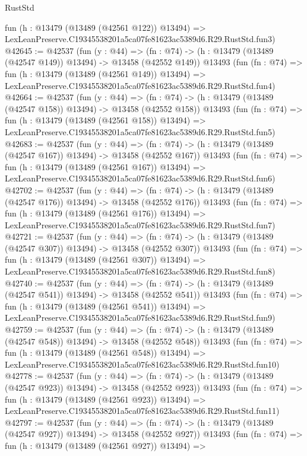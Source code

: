 \begin{lexlean}{RustStd}
\begin{coremodule}
    fun (h : @13479 (@13489 (@42561 @122)) @13494) =>
    LexLeanPreserve.C19345538201a5ca07fe81623ac5389d6.R29.RustStd.fun3)
@42645 := @42537
    (fun (y : @44) =>
    (fn : @74) -> (h : @13479 (@13489 (@42547 @149)) @13494) -> @13458 (@42552 @149))
    @13493
    (fun (fn : @74) =>
    fun (h : @13479 (@13489 (@42561 @149)) @13494) =>
    LexLeanPreserve.C19345538201a5ca07fe81623ac5389d6.R29.RustStd.fun4)
@42664 := @42537
    (fun (y : @44) =>
    (fn : @74) -> (h : @13479 (@13489 (@42547 @158)) @13494) -> @13458 (@42552 @158))
    @13493
    (fun (fn : @74) =>
    fun (h : @13479 (@13489 (@42561 @158)) @13494) =>
    LexLeanPreserve.C19345538201a5ca07fe81623ac5389d6.R29.RustStd.fun5)
@42683 := @42537
    (fun (y : @44) =>
    (fn : @74) -> (h : @13479 (@13489 (@42547 @167)) @13494) -> @13458 (@42552 @167))
    @13493
    (fun (fn : @74) =>
    fun (h : @13479 (@13489 (@42561 @167)) @13494) =>
    LexLeanPreserve.C19345538201a5ca07fe81623ac5389d6.R29.RustStd.fun6)
@42702 := @42537
    (fun (y : @44) =>
    (fn : @74) -> (h : @13479 (@13489 (@42547 @176)) @13494) -> @13458 (@42552 @176))
    @13493
    (fun (fn : @74) =>
    fun (h : @13479 (@13489 (@42561 @176)) @13494) =>
    LexLeanPreserve.C19345538201a5ca07fe81623ac5389d6.R29.RustStd.fun7)
@42721 := @42537
    (fun (y : @44) =>
    (fn : @74) -> (h : @13479 (@13489 (@42547 @307)) @13494) -> @13458 (@42552 @307))
    @13493
    (fun (fn : @74) =>
    fun (h : @13479 (@13489 (@42561 @307)) @13494) =>
    LexLeanPreserve.C19345538201a5ca07fe81623ac5389d6.R29.RustStd.fun8)
@42740 := @42537
    (fun (y : @44) =>
    (fn : @74) -> (h : @13479 (@13489 (@42547 @541)) @13494) -> @13458 (@42552 @541))
    @13493
    (fun (fn : @74) =>
    fun (h : @13479 (@13489 (@42561 @541)) @13494) =>
    LexLeanPreserve.C19345538201a5ca07fe81623ac5389d6.R29.RustStd.fun9)
@42759 := @42537
    (fun (y : @44) =>
    (fn : @74) -> (h : @13479 (@13489 (@42547 @548)) @13494) -> @13458 (@42552 @548))
    @13493
    (fun (fn : @74) =>
    fun (h : @13479 (@13489 (@42561 @548)) @13494) =>
    LexLeanPreserve.C19345538201a5ca07fe81623ac5389d6.R29.RustStd.fun10)
@42778 := @42537
    (fun (y : @44) =>
    (fn : @74) -> (h : @13479 (@13489 (@42547 @923)) @13494) -> @13458 (@42552 @923))
    @13493
    (fun (fn : @74) =>
    fun (h : @13479 (@13489 (@42561 @923)) @13494) =>
    LexLeanPreserve.C19345538201a5ca07fe81623ac5389d6.R29.RustStd.fun11)
@42797 := @42537
    (fun (y : @44) =>
    (fn : @74) -> (h : @13479 (@13489 (@42547 @927)) @13494) -> @13458 (@42552 @927))
    @13493
    (fun (fn : @74) =>
    fun (h : @13479 (@13489 (@42561 @927)) @13494) =>

\end{coremodule}
\end{lexlean}
